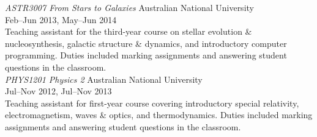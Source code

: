 \documentclass[11pt]{res} %
\begin{document}
\begin{resume}
	{\it ASTR3007 From Stars to Galaxies} \hfill Australian National University\\
	\null\hfill Feb--Jun 2013, May--Jun 2014\\
	Teaching assistant for the third-year course on stellar evolution \& nucleosynthesis, galactic structure \& dynamics, and introductory computer programming. Duties included marking assignments and answering student questions in the classroom.\\

	{\it PHYS1201 Physics 2} \hfill Australian National University\\
	\null\hfill Jul--Nov 2012, Jul--Nov 2013\\
	Teaching assistant for first-year course covering introductory special relativity, electromagnetism, waves \& optics, and thermodynamics. Duties included marking assignments and answering student questions in the classroom.
 
\begin{comment}
\section{Referees}
	\textbf{Dr. Amanda Karakas}\\
	Future Fellow, Research School of Astronomy \& Astrophysics\\
	Australian National University\\
	amanda.karakas@anu.edu.au

	\textbf{Prof. Gary Da Costa}\\
	Professor, Research School of Astronomy \& Astrophysics\\
	Australian National University\\
	gary.dacosta@anu.edu.au

	\textbf{Dr. Chiaki Kobayashi}\\
	Senior Lecturer, Centre for Astrophysics Research\\
	University of Hertfordshire, UK\\
	c.kobayashi@herts.ac.uk
\end{comment}
\end{resume}
\end{document}
